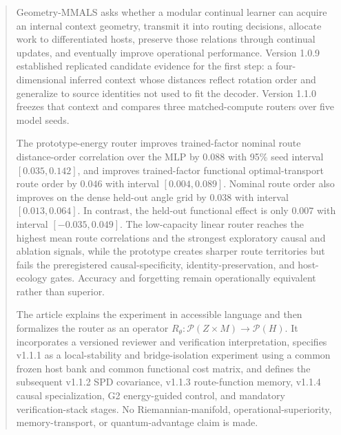 \documentclass[11pt,a4paper]{article}
\newcommand{\Pcal}{\mathcal{P}}
\begin{document}
\begin{abstract}
Geometry-MMALS asks whether a modular continual learner can acquire an internal context geometry, transmit it into routing decisions, allocate work to differentiated hosts, preserve those relations through continual updates, and eventually improve operational performance. Version 1.0.9 established replicated candidate evidence for the first step: a four-dimensional inferred context whose distances reflect rotation order and generalize to source identities not used to fit the decoder. Version 1.1.0 freezes that context and compares three matched-compute routers over five model seeds.

The prototype-energy router improves trained-factor nominal route distance-order correlation over the MLP by $0.088$ with 95\% seed interval $[0.035,0.142]$, and improves trained-factor functional optimal-transport route order by $0.046$ with interval $[0.004,0.089]$. Nominal route order also improves on the dense held-out angle grid by $0.038$ with interval $[0.013,0.064]$. In contrast, the held-out functional effect is only $0.007$ with interval $[-0.035,0.049]$. The low-capacity linear router reaches the highest mean route correlations and the strongest exploratory causal and ablation signals, while the prototype creates sharper route territories but fails the preregistered causal-specificity, identity-preservation, and host-ecology gates. Accuracy and forgetting remain operationally equivalent rather than superior.

The article explains the experiment in accessible language and then formalizes the router as an operator $R_\theta:\Pcal(Z\times M)\to\Pcal(H)$. It incorporates a versioned reviewer and verification interpretation, specifies v1.1.1 as a local-stability and bridge-isolation experiment using a common frozen host bank and common functional cost matrix, and defines the subsequent v1.1.2 SPD covariance, v1.1.3 route-function memory, v1.1.4 causal specialization, G2 energy-guided control, and mandatory verification-stack stages. No Riemannian-manifold, operational-superiority, memory-transport, or quantum-advantage claim is made.
\end{abstract}
\tableofcontents
\clearpage
\end{document}
